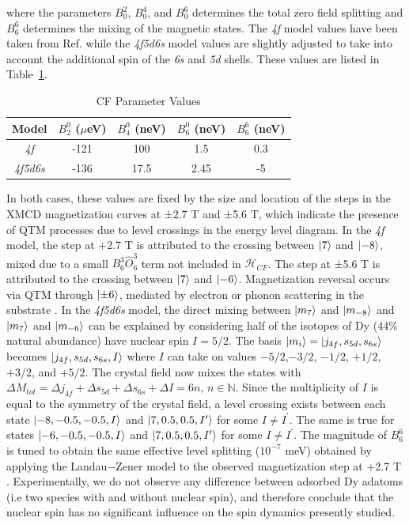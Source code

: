 \documentclass[reprint,amsmath,amssymb,aps,nofootinbib,onecolumn]{revtex4-2}
\begin{document}
where the parameters $B^{2}_{0}$, $B^{4}_{0}$, and $B^{6}_{0}$ determines the total zero field splitting and $B^{6}_{6}$ determines the mixing of the magnetic states. The \textit{4f} model values have been taken from Ref.\cite{baltic2018} while the \textit{4f5d6s} model values are slightly adjusted to take into account the additional spin of the \textit{6s} and \textit{5d} shells. These values are listed in Table~\ref{table:CF}. 
\begin{table}[h!]
\centering
 \begin{tabular}{|c||c|c|c|c|}
 \hline
 Model & $B^{0}_{2}$ ($\mu$eV) & $B^{0}_{4}$ (neV) & $B^{0}_{6}$ (neV) & $B^{6}_{6}$ (neV) 
 \\ [1ex] 
 \hline 
 \hline 
 \textit{4f} & -121 & 100 & 1.5 & 0.3 \\
 \hline
  \textit{4f5d6s} & -136 & 17.5 & 2.45 & -5 \\
 \hline
 \end{tabular}
 \caption{CF Parameter Values}
 \label{table:CF}
\end{table}
In both cases, these values are fixed by the size and location of the steps in the XMCD magnetization curves at ±2.7 T and ±5.6 T, which indicate the presence of QTM processes due to level crossings in the energy level diagram. In the \textit{4f} model, the step at +2.7 T is attributed to the crossing between $\ket{7}$ and $\ket{-8}$, mixed due to a small $B^{3}_{6} \hat{O}^{3}_{6}$ term not included in $\mathcal{H}_{CF}$. The step at ±5.6 T is attributed to the crossing between $\ket{7}$ and $\ket{-6}$. Magnetization reversal occurs via QTM through $\ket{\pm 6}$, mediated by electron or phonon scattering in the substrate \cite{baltic2018,baltic2016}. In the \textit{4f5d6s} model, the direct mixing between $\ket{m_7}$ and $\ket{m_{-8}}$ and $\ket{m_7}$ and $\ket{m_{-6}}$ can be explained by considering half of the isotopes of Dy (44$\%$ natural abundance) have nuclear spin $I = 5/2$. The basis $\ket{m_i}=\ket{j_{4f},s_{5d},s_{6s}}$ becomes $\ket{j_{4f},s_{5d},s_{6s},I}$ where $I$ can take on values $-5/2$,$-3/2$, $-1/2$, $+1/2$, $+3/2$, and $+5/2$. The crystal field now mixes the states with $\Delta M_{tot}=\Delta j_{4f} + \Delta s_{5d} + \Delta s_{6s} + \Delta I=6n$, $n\in \mathbb{N}$. Since the multiplicity of $I$ is equal to the symmetry of the crystal field, a level crossing exists between each state $\ket{-8,-0.5,-0.5,I}$ and $\ket{7,0.5,0.5,I^\prime}$ for some $I \ne I^\prime$. The same is true for states $\ket{-6,-0.5,-0.5,I}$ and $\ket{7,0.5,0.5,I^\prime}$ for some $I \ne I^\prime$. The magnitude of $B^{6}_{6}$ is tuned to obtain the same effective level splitting ($10^{−7}$ meV) obtained by applying the Landau−Zener model to the observed magnetization step at +2.7 T \cite{baltic2016, zener1932}. Experimentally, we do not observe any difference between adsorbed Dy adatoms (i.e two species with and without nuclear spin), and therefore conclude that the nuclear spin has no significant influence on the spin dynamics presently studied. \par
\end{document}
